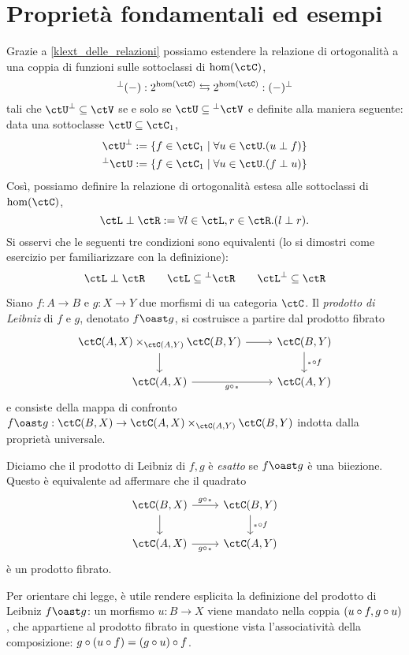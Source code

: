 \section[Proprietà ed esempi]{Proprietà fondamentali ed esempi}
\begin{remark}
	Grazie a \ref{klext_delle_relazioni} possiamo estendere la relazione di ortogonalità a una coppia di funzioni sulle sottoclassi di \(\hom(\ctC)\),
	\[\lort{(-)} : 2^{\hom(\ctC)} \leftrightarrows 2^{\hom(\ctC)} : \rort{(-)}\]
	tali che \(\rort\ctU\subseteq\ctV\) se e solo se \(\ctU\subseteq\lort\ctV\) e definite alla maniera seguente: data una sottoclasse \(\ctU\subseteq \ctC_1\),
	\begin{gather*}
		\rort{\ctU} := \{f\in\ctC_1\mid \forall u\in\ctU.(u\perp f)\}\\
		\lort{\ctU} := \{f\in\ctC_1\mid \forall u\in\ctU.(f\perp u)\}
	\end{gather*}
	Così, possiamo definire la relazione di ortogonalità estesa alle sottoclassi di \(\hom(\ctC)\),
	\[\ctL\perp \ctR := \forall l\in\ctL,r\in\ctR.(l\perp r).\]
	Si osservi che le seguenti tre condizioni sono equivalenti (lo si dimostri come esercizio per familiarizzare con la definizione):
	\[\ctL\perp\ctR\qquad \ctL\subseteq\lort\ctR\qquad \rort\ctL\subseteq \ctR\]
\end{remark}
\begin{definition}
	Siano \(f : A \to B\) e \(g : X\to Y\) due morfismi di ua categoria \(\ctC\). Il \emph{prodotto di Leibniz} di \(f\) e \(g\), denotato \(f\oast g\), si costruisce a partire dal prodotto fibrato
	\[
		\begin{tikzcd}
			\pull {\Hom{\ctC}(A,X)}{\Hom{\ctC}(B,Y)}{\Hom{\ctC}(A,Y)} \ar[r]\ar[d] & \Hom{\ctC}(B,Y) \ar[d, "\blank\cmp f"]\\
			\Hom{\ctC}(A,X) \ar[r, "g\cmp\blank"'] & \Hom{\ctC}(A,Y)
		\end{tikzcd}
	\]
	e consiste della mappa di confronto \(f\oast g : \Hom{\ctC}(B,X) \to \pull {\Hom{\ctC}(A,X)}{\Hom{\ctC}(B,Y)}{\Hom{\ctC}(A,Y)}\) indotta dalla proprietà universale.

	Diciamo che il prodotto di Leibniz di \(f,g\) è \emph{esatto} se \(f\oast g\) è una biiezione. Questo è equivalente ad affermare che il quadrato
	\[
		\begin{tikzcd}
			\Hom{\ctC}(B,X) \ar[d]\ar[r,"g\cmp\blank"]& \Hom{\ctC}(B,Y)\ar[d, "\blank\cmp f"]\\
			\Hom{\ctC}(A,X) \ar[r, "g\cmp\blank"'] & \Hom{\ctC}(A,Y)
		\end{tikzcd}
	\]
	è un prodotto fibrato.
\end{definition}
Per orientare chi legge, è utile rendere esplicita la definizione del prodotto di Leibniz \(f\oast g\): un morfismo \(u : B\to X\) viene mandato nella coppia \((u\circ f, g\circ u)\), che appartiene al prodotto fibrato in questione vista l'associatività della composizione: \(g\circ (u\circ f) = (g\circ u)\circ f\).


